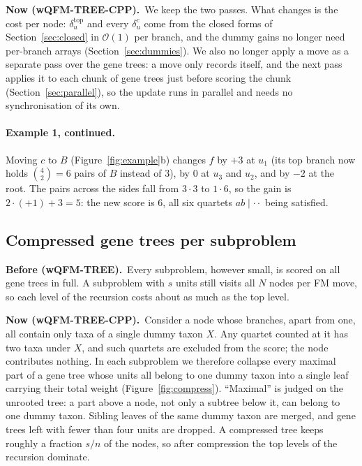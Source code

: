 \documentclass[11pt,a4paper]{article}
\newcommand{\wqfmtree}{wQFM-TREE}
\newcommand{\cpp}{wQFM-TREE-CPP}
\newcommand{\Oh}{\mathcal{O}}
\newcommand{\Before}{\par\smallskip\noindent\textbf{\textcolor{beforec}{Before (\wqfmtree).}}\ }
\newcommand{\Now}{\par\smallskip\noindent\textbf{\textcolor{nowc}{Now (\cpp).}}\ }
\begin{document}
\Now We keep the two passes. What changes is the cost per node: $\delta^{\mathrm{top}}_u$ and every
$\delta^c_u$ come from the closed forms of Section~\ref{sec:closed} in $\Oh(1)$ per branch, and the
dummy gains no longer need per-branch arrays (Section~\ref{sec:dummies}). We also no longer apply a
move as a separate pass over the gene trees: a move only records itself, and the next pass applies it
to each chunk of gene trees just before scoring the chunk (Section~\ref{sec:parallel}), so the update
runs in parallel and needs no synchronisation of its own.

\paragraph{Example 1, continued.} Moving $c$ to $B$ (Figure~\ref{fig:example}b) changes $f$ by
$+3$ at $u_1$ (its top branch now holds $\binom42=6$ pairs of $B$ instead of 3), by $0$ at $u_3$
and $u_2$, and by $-2$ at the root. The pairs across the sides fall from $3\cdot3$ to $1\cdot6$, so the
gain is $2\cdot(+1)+3=5$: the new score is $6$, all six quartets $ab\mid\cdot\cdot$ being satisfied.

\subsection{Compressed gene trees per subproblem}\label{sec:compress}

\Before Every subproblem, however small, is scored on all gene trees in full. A subproblem with $s$
units still visits all $N$ nodes per FM move, so each level of the recursion costs about as much as
the top level.

\Now Consider a node whose branches, apart from one, all contain only taxa of a single dummy taxon
$X$. Any quartet counted at it has two taxa under $X$, and such quartets are excluded from the
score; the node contributes nothing. In each subproblem we therefore collapse every maximal part of
a gene tree whose units all belong to one dummy taxon into a single leaf carrying their total weight
(Figure~\ref{fig:compress}). ``Maximal'' is judged on the unrooted tree: a part above a node, not
only a subtree below it, can belong to one dummy taxon. Sibling leaves of the same dummy taxon are
merged, and gene trees left with fewer than four units are dropped. A compressed tree keeps roughly
a fraction $s/n$ of the nodes, so after compression the top levels of the recursion dominate.
\end{document}
